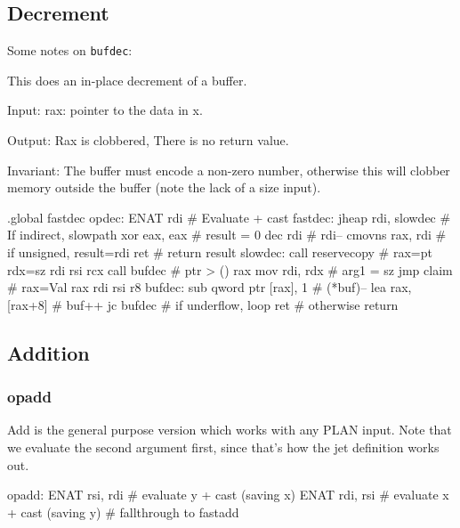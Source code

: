 \subsection{Decrement}

Some notes on \lstinline|bufdec|:

This does an in-place decrement of a buffer.

Input: rax: pointer to the data in x.

Output: Rax is clobbered, There is no return value.

Invariant: The buffer must encode a non-zero number, otherwise this
will clobber memory outside the buffer (note the lack of a size input).

\begin{asm}
.global fastdec
opdec:
	ENAT	rdi                         # Evaluate + cast
fastdec:
	jheap	rdi, slowdec                # If indirect, slowpath
	xor	eax, eax                    # result = 0
	dec	rdi                         # rdi--
	cmovns	rax, rdi                    # if unsigned, result=rdi
	ret                                 # return result
slowdec:
	call	reservecopy                 # rax=pt rdx=sz {rdi rsi rcx}
	call	bufdec                      # ptr > () {rax}
	mov	rdi, rdx                    # arg1 = sz
	jmp	claim                       # rax=Val {rax rdi rsi r8}
bufdec:
	sub	qword ptr [rax], 1          # (*buf)--
	lea	rax, [rax+8]                # buf++
	jc	bufdec                      # if underflow, loop
	ret                                 # otherwise return
\end{asm}

\subsection{Addition}

\subsubsection{opadd}

Add is the general purpose version which works with any PLAN input.
Note that we evaluate the second argument first, since that's how the
jet definition works out.

\begin{asm}
opadd:
	ENAT	rsi, rdi                    # evaluate y + cast (saving x)
	ENAT	rdi, rsi                    # evaluate x + cast (saving y)
	# fallthrough to fastadd
\end{asm}

